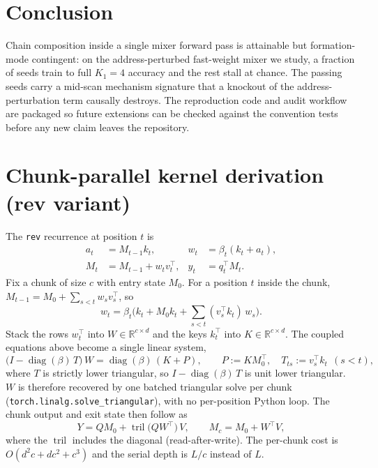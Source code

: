 \documentclass[11pt]{article}
\begin{document}
\section{Conclusion}
\label{sec:conclusion}

Chain composition inside a single mixer forward pass is attainable but
formation-mode contingent: on the address-perturbed fast-weight mixer we
study, a fraction of seeds train to full $K_1{=}4$ accuracy and the rest
stall at chance. The passing seeds carry a mid-scan mechanism signature
that a knockout of the address-perturbation term causally destroys. The
reproduction code and audit workflow are packaged so future
extensions can be checked against the convention tests before any new
claim leaves the repository.




\appendix

\section{Chunk-parallel kernel derivation (rev variant)}
\label{app:chunked}

The \texttt{rev} recurrence at position $t$ is
\begin{align}
a_t &= M_{t-1} k_t, & w_t &= \beta_t (k_t + a_t), \\
M_t &= M_{t-1} + w_t v_t^{\top}, & y_t &= q_t^{\top} M_t .
\end{align}
Fix a chunk of size $c$ with entry state $M_0$. For a position $t$ inside
the chunk, $M_{t-1} = M_0 + \sum_{s<t} w_s v_s^{\top}$, so
\begin{equation}
w_t = \beta_t \Big( k_t + M_0 k_t + \sum_{s<t} (v_s^{\top} k_t)\, w_s \Big).
\end{equation}
Stack the rows $w_t^{\top}$ into $W \in \mathbb{R}^{c \times d}$ and the keys
$k_t^{\top}$ into $K \in \mathbb{R}^{c \times d}$. The coupled equations above
become a single linear system,
\begin{equation}
\big(I - \operatorname{diag}(\beta)\, T\big)\, W
  = \operatorname{diag}(\beta)\,(K + P),
\qquad
P := K M_0^{\top}, \quad
T_{ts} := v_s^{\top} k_t \ \ (s < t),
\end{equation}
where $T$ is strictly lower triangular, so $I - \operatorname{diag}(\beta)\, T$
is unit lower triangular. $W$ is therefore recovered by one batched triangular
solve per chunk (\texttt{torch.linalg.solve\_triangular}), with no
per-position Python loop. The chunk output and exit state then follow as
\begin{equation}
Y = Q M_0 + \operatorname{tril}\!\big(Q W^{\top}\big)\, V,
\qquad
M_c = M_0 + W^{\top} V,
\end{equation}
where the $\operatorname{tril}$ includes the diagonal (read-after-write). The
per-chunk cost is $O(d^2 c + d c^2 + c^3)$ and the serial depth is $L/c$
instead of $L$.
\end{document}
